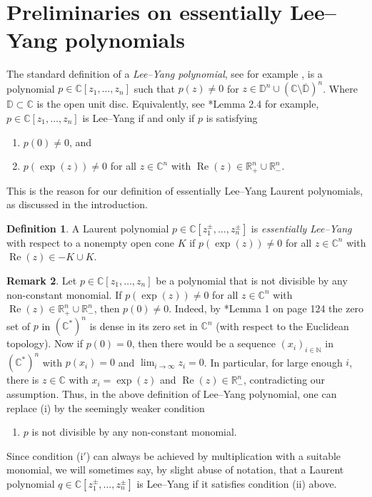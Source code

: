 \documentclass[11pt,letterpaper]{amsart}
\theoremstyle{definition}
\newtheorem{Def}{Definition}[section]
\newtheorem{rem}[Def]{Remark}
\theoremstyle{plain}
\newcommand{\Rea}{\operatorname{Re}}
\newcommand{\C}{{\mathbb C}}
\newcommand{\R}{{\mathbb R}}
\newcommand{\N}{{\mathbb N}}
\begin{document}
\section{Preliminaries on essentially Lee--Yang polynomials}\label{sec:propleeyang}
The standard definition of a \emph{Lee--Yang polynomial}, see for example \cite{Ruelle2010}, is a polynomial  $p\in\C[z_1,\ldots,z_n]$ such that $p(z)\ne 0 $ for $z\in\mathbb{D}^n\cup(\C\setminus\overline{\mathbb{D}})^n$. Where $\mathbb{D}\subset\C$ is the open unit disc. Equivalently, see \cite{AlonCohenVinzant}*{Lemma 2.4} for example, $p\in\C[z_1,\ldots,z_n]$ is Lee--Yang if and only if $p$ is satisfying
\begin{enumerate}
    \item[(i)] $p(0)\ne 0$, and
    \item[(ii)] $p(\exp(z))\neq0$ for all $z\in\C^n$ with $\Rea(z)\in \R_{+}^n\cup\R_{-}^n$. 
\end{enumerate}
This is the reason for our definition of essentially Lee--Yang Laurent polynomials, as discussed in the introduction.
\begin{Def}
    A Laurent polynomial $p\in\C[z_1^{\pm},\ldots,z_n^{\pm}]$ is \emph{essentially Lee--Yang} with respect to a nonempty open  cone $K$ if $p(\exp(z))\neq0$ for all $z\in\C^n$ with $\Rea(z)\in -K\cup K$.
\end{Def}
\begin{rem}\label{rem:noconstantterm}
    Let $p\in\C[z_1,\ldots,z_n]$ be a polynomial that is not divisible by any non-constant monomial. If $p(\exp(z))\neq0$ for all $z\in\C^n$ with $\Rea(z)\in \R_{+}^n\cup\R_{-}^n$, then $p(0)\neq0$. Indeed, by \cite{shafarevich2}*{Lemma 1 on page 124} the zero set of $p$ in $(\C^*)^n$ is dense in its zero set in $\C^n$ (with respect to the Euclidean topology). Now if $p(0)=0$, then there would be a sequence $(x_i)_{i\in\N}$ in $(\C^*)^n$ with $p(x_i)=0$ and $\lim_{i\to\infty}z_i=0$. In particular, for large enough $i$, there is $z\in\C$ with $x_i=\exp(z)$ and $\Rea(z)\in\R_-^n$, contradicting our assumption. Thus, in the above definition of Lee--Yang polynomial, one can replace (i) by the seemingly weaker condition
    \begin{enumerate}
        \item[(i$'$)] $p$ is not divisible by any non-constant monomial.
    \end{enumerate}
    Since condition (i$'$) can always be achieved by multiplication with a suitable monomial, we will sometimes say, by slight abuse of notation, that a Laurent polynomial $q\in \C[z_1^{\pm},\ldots,z_n^{\pm}]$ is Lee--Yang if it satisfies condition (ii) above.
\end{rem}
\end{document}
